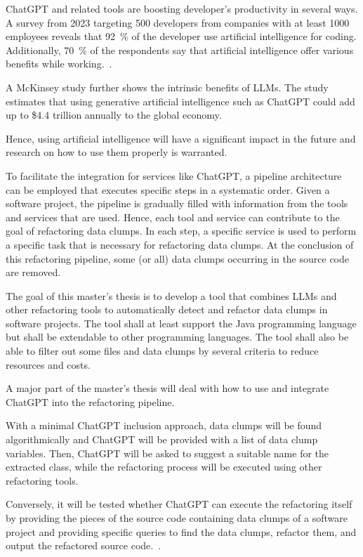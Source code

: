   ChatGPT and related tools are boosting developer's productivity in several ways. A survey from 2023 targeting 500 developers from companies with at least 1000 employees reveals that 92~\% of the developer use artificial intelligence for coding. Additionally, 70~\% of the respondents say that artificial intelligence offer various benefits  while working.~\cite{ai_companies}. 

  A McKinsey study further shows the intrinsic benefits of \acp{LLM}. The study estimates that using generative artificial intelligence such as ChatGPT could add up to \$4.4 trillion annually to the global economy.~\cite{ai_mckinsey}

  Hence, using artificial intelligence will have a significant impact in the future and research on how to use them properly is warranted. 


To facilitate the integration for services like ChatGPT, a pipeline architecture can be employed  that executes specific steps in a systematic order.  Given a software project, the pipeline is gradually filled with information from the tools and services that are used. Hence, each tool and service can contribute to the goal of refactoring data clumps.  In each step, a specific service is used to perform a specific task that is necessary for refactoring data clumps. At the conclusion of this refactoring pipeline, some (or all) data clumps occurring in the source code are removed.  




The goal of this master's thesis is to develop a tool that combines \acp{LLM} and other refactoring tools to automatically detect and refactor data clumps in software projects. The tool  shall at least support the Java programming language but shall be extendable to  other programming languages. The tool shall also  be able to filter out some files and data clumps by several criteria to reduce resources and costs. 


A major part of the master's thesis will deal with how to use and integrate ChatGPT into the refactoring pipeline. 

With a minimal ChatGPT inclusion approach,  data clumps will be found algorithmically  and ChatGPT will be provided with a list of data clump variables. Then, ChatGPT will be  asked to suggest a suitable name for the extracted class, while the refactoring process will be executed using other refactoring tools.


Conversely, it will be tested whether ChatGPT can execute the refactoring itself by providing the pieces of the source code containing data clumps of a software project and providing specific queries to find the data clumps, refactor them, and output the refactored source code.~\cite{White2024}.

